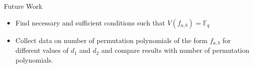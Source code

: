 \documentclass{beamer}
\begin{document}


\begin{frame}{Future Work}
  \begin{itemize}
    \item Find necessary and sufficient conditions such that $V(f_{a,b}) = \mathbb{F}_q$
    \item Collect data on number of permutation polynomials of the form $f_{a,b}$ for different values of $d_1$ and $d_2$ and compare results with number of permutation polynomials.
  \end{itemize}
\end{frame}

\end{document}
